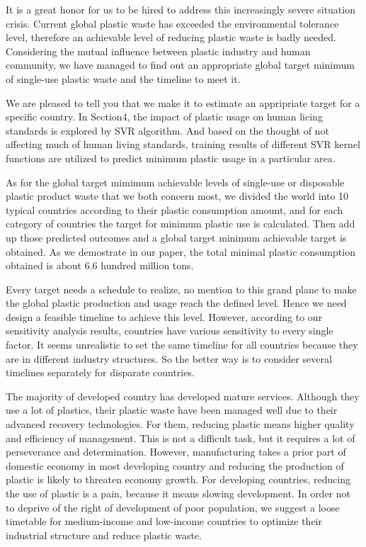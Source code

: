 \documentclass{mcmthesis}
\begin{document}
\begin{memo}[Memorandum]

It is a great honor for us to be hired to address this increasingly severe situation crisis. Current global plastic waste has exceeded the environmental tolerance level, therefore an achievable level of reducing plastic waste is badly needed. Considering the mutual influence between plastic industry and human community, we have managed to find out an appropriate global target minimum of single-use plastic waste and the timeline to meet it. 

We are pleased to tell you that we make it to estimate an appripriate target for a specific country. In Section4, the impact of plastic usage on human licing standards is explored by SVR algorithm. And based on the thought of not affecting much of human living standards, training results of different SVR kernel functions are utilized to predict minimum plastic usage in a particular area. 

As for the global target mimimum achievable levels of single-use or disposable plastic product waste that we both concern most,  we divided the world into 10 typical countries according to their plastic consumption amount,  and for each category of countries the target for minimum plastic use is calculated. Then add up those predicted outcomes and a global target minimum achievable target is obtained. As we demostrate in our paper, the total minimal plastic consumption obtained is about 6.6 hundred million tons.

Every target needs a schedule to  realize, no mention to this grand plane to make the global plastic production and usage reach the defined level. Hence we need design a feasible timeline to achieve this level. However, according to our sensitivity analysis results, countries have various sensitivity to every single factor. It seems unrealistic to set the same timeline for all countries because they are in different industry structures.  So the better way is to consider several timelines separately for disparate countries. 


The majority of developed country has developed mature services. Although they use a lot of plastics, their plastic waste have been managed well due to their advanced recovery technologies. For them, reducing plastic means higher quality and efficiency of management. This is not a difficult task, but it requires a lot of perseverance and determination. However, manufacturing takes a prior part of domestic economy in most developing country and reducing the production of plastic is likely to threaten economy growth. For developing countries, reducing the use of plastic is a pain, because it means slowing development. In order not to deprive of the right of development of poor population, we suggest a loose timetable for medium-income and low-income countries to optimize their industrial structure and reduce plastic waste.


\end{memo}
\end{document}
